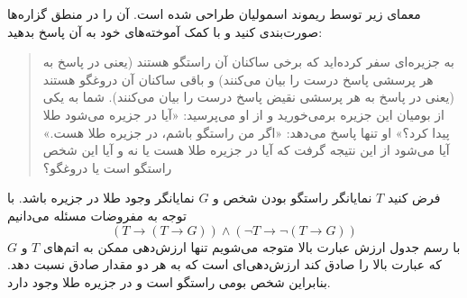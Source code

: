 معمای زیر توسط ریموند اسمولیان طراحی شده است. آن را در منطق گزاره‌ها صورت‌بندی کنید و با کمک آموخته‌های خود به آن پاسخ بدهید:
\begin{quote}
به جزیره‌ای سفر کرده‌اید که برخی ساکنان آن راستگو هستند (یعنی در پاسخ به هر پرسشی پاسخ درست را بیان می‌کنند) و باقی ساکنان آن دروغگو هستند (یعنی در پاسخ به هر پرسشی نقیض پاسخ درست را بیان می‌کنند). شما به یکی از بومیان این جزیره برمی‌خورید و از او می‌پرسید: «آیا در جزیره می‌شود طلا پیدا کرد؟» او تنها پاسخ می‌دهد: «اگر من راستگو باشم، در جزیره طلا هست.» آیا می‌شود از این نتیجه گرفت که آیا در جزیره طلا هست یا نه و آیا این شخص راستگو است یا دروغگو؟
\end{quote}\!\vspace{-0.4cm}
\begin{ans}
فرض کنید $T$ نمایانگر راستگو بودن شخص و $G$ نمایانگر وجود طلا در جزیره باشد. با توجه به مفروضات مسئله می‌دانیم
$$
(T\to(T\to G))\wedge(\neg T\to\neg(T\to G))
$$
با رسم جدول ارزش عبارت بالا متوجه می‌شویم تنها ارزش‌دهی ممکن به اتم‌های $T$ و $G$ که عبارت بالا را صادق کند ارزش‌دهی‌ای است که به هر دو مقدار صادق نسبت دهد. بنابراین شخص بومی راستگو است و در جزیره طلا وجود دارد.
\end{ans}
